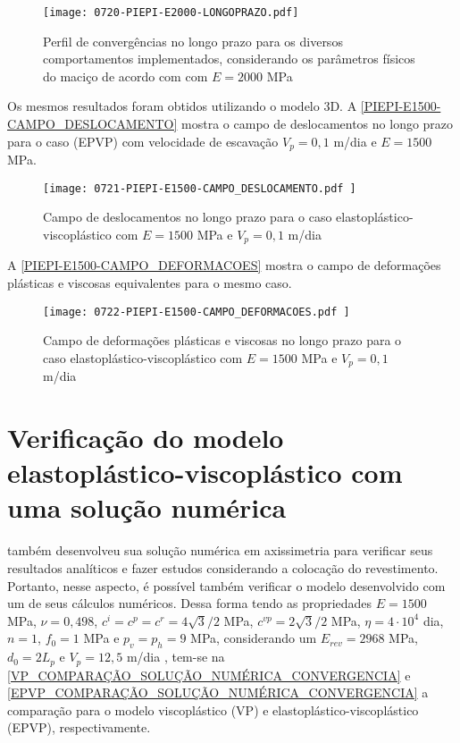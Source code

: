 \begin{figure}[H]
	\begin{center}
		\texttt{[image: 0720-PIEPI-E2000-LONGOPRAZO.pdf]}
	\end{center}
	\caption{\label{PIEPI-E2000-LONGOPRAZO}Perfil de convergências no longo prazo para os diversos comportamentos implementados, considerando os parâmetros físicos do maciço de acordo com  com $E=2000$ MPa}
\end{figure}

Os mesmos resultados foram obtidos utilizando o modelo 3D. A \autoref{PIEPI-E1500-CAMPO_DESLOCAMENTO} mostra o campo de deslocamentos no longo prazo para o caso (EPVP) com velocidade de escavação $V_p=0,1$ m/dia e $E=1500$ MPa.

\begin{figure}[H]
	\begin{center}
		\texttt{[image: 0721-PIEPI-E1500-CAMPO\_DESLOCAMENTO.pdf
		]}
	\end{center}
	\caption{\label{PIEPI-E1500-CAMPO_DESLOCAMENTO}Campo de deslocamentos no longo prazo para o caso elastoplástico-viscoplástico com $E=1500$ MPa e $V_p=0,1$ m/dia}
\end{figure}

A \autoref{PIEPI-E1500-CAMPO_DEFORMACOES} mostra o campo de deformações plásticas e viscosas equivalentes para o mesmo caso.

\begin{figure}[H]
	\begin{center}
		\texttt{[image: 0722-PIEPI-E1500-CAMPO\_DEFORMACOES.pdf
		]}
	\end{center}
	\caption{\label{PIEPI-E1500-CAMPO_DEFORMACOES}Campo de deformações plásticas e viscosas no longo prazo para o caso elastoplástico-viscoplástico com $E=1500$ MPa e $V_p=0,1$ m/dia}
\end{figure}

\section{Verificação do modelo elastoplástico-viscoplástico com uma solução numérica}

 também desenvolveu sua solução numérica em axissimetria para verificar seus resultados analíticos e fazer estudos considerando a colocação do revestimento. Portanto, nesse aspecto, é possível também verificar o modelo desenvolvido com um de seus cálculos numéricos. Dessa forma tendo as propriedades $E=1500$ MPa, $\nu=0,498$, $c^i=c^p=c^r =4\sqrt{3}/2$ MPa, $c^{vp}=2\sqrt{3}/2$ MPa, $\eta = 4 \cdot 10^4$ dia, $n=1$, $f_0=1$ MPa e $p_v=p_h=9$ MPa, considerando um $E_{rev} = 2968$ MPa, $d_0 = 2L_p$ e $V_p=12,5$ m/dia \cite[p. 128, 132]{Piepi1995}, tem-se na \autoref{VP_COMPARAÇÃO_SOLUÇÃO_NUMÉRICA_CONVERGENCIA} e \autoref{EPVP_COMPARAÇÃO_SOLUÇÃO_NUMÉRICA_CONVERGENCIA} a comparação para o modelo viscoplástico (VP) e elastoplástico-viscoplástico (EPVP), respectivamente.

